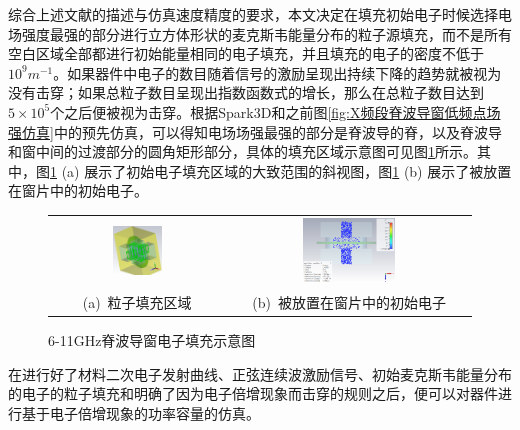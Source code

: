 \documentclass[master]{thesis-uestc}
\begin{document}
综合上述文献的描述与仿真速度精度的要求，本文决定在填充初始电子时候选择电场强度最强的部分进行立方体形状的麦克斯韦能量分布的粒子源填充，而不是所有空白区域全部都进行初始能量相同的电子填充，并且填充的电子的密度不低于$10^9 m^{-1}$。如果器件中电子的数目随着信号的激励呈现出持续下降的趋势就被视为没有击穿；如果总粒子数目呈现出指数函数式的增长，那么在总粒子数目达到$5 \times 10^5$个之后便被视为击穿。根据Spark3D和之前图\ref{fig:X频段脊波导窗低频点场强仿真}中的预先仿真，可以得知电场场强最强的部分是脊波导的脊，以及脊波导和窗中间的过渡部分的圆角矩形部分，具体的填充区域示意图可见图\ref{fig:X粒子填充区域}所示。其中，图\ref{fig:X粒子填充区域} (a) 展示了初始电子填充区域的大致范围的斜视图，图\ref{fig:X粒子填充区域} (b) 展示了被放置在窗片中的初始电子。
\begin{figure}[!htb]
    \small
    \centering
    \begin{tabular}{@{\ }c@{\ }c}
        \includegraphics[width=0.3\textwidth]{pic/chapter3/粒子填充区域斜视图.png} & 
        \hspace{5pt}
        \includegraphics[width=0.4\textwidth]{pic/chapter3/XPIC初始电子位置.png}     \\
        \mbox{\small (a) 粒子填充区域}                                                                               & 
        \mbox{\small (b) 被放置在窗片中的初始电子}                                                                                  \\
    \end{tabular}
    \caption{6-11GHz脊波导窗电子填充示意图}
    \label{fig:X粒子填充区域}
\end{figure}



在进行好了材料二次电子发射曲线、正弦连续波激励信号、初始麦克斯韦能量分布的电子的粒子填充和明确了因为电子倍增现象而击穿的规则之后，便可以对器件进行基于电子倍增现象的功率容量的仿真。
\end{document}
